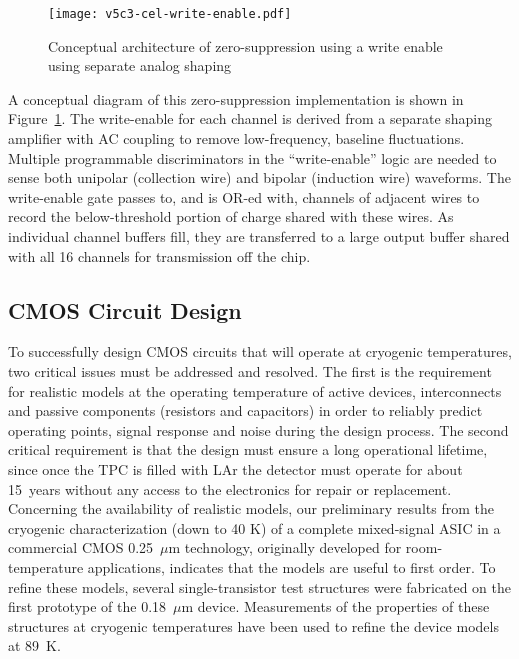 \begin{figure}[htbp]
\centering
\texttt{[image: v5c3-cel-write-enable.pdf]}
\caption[Conceptual architecture of zero-suppression]{Conceptual architecture of zero-suppression using a write enable using separate analog shaping}
\label{fig:tpc-elec-write-enable}
\end{figure}


A conceptual diagram of this zero-suppression implementation is shown
in Figure~\ref{fig:tpc-elec-write-enable}. The write-enable for each channel is derived from a separate
shaping amplifier with AC coupling to remove low-frequency, baseline
fluctuations. Multiple programmable discriminators in the
``write-enable'' logic are
needed to sense both unipolar (collection wire) and bipolar (induction
wire) waveforms.  The write-enable gate passes to, and is OR-ed with,
channels of adjacent wires to record the below-threshold portion of
charge shared with these wires. As individual channel buffers fill, they
are transferred to a large output buffer shared with all 16
channels for transmission off the chip.

\subsection{CMOS Circuit Design}

To successfully design CMOS circuits that will operate at cryogenic 
temperatures, two critical issues must be addressed and resolved. 
The first is the requirement for realistic models at the operating temperature 
of active devices, interconnects and passive components (resistors and 
capacitors) in order to reliably predict operating points, signal response 
and noise during the design process. The second critical requirement is 
that the design must ensure a long operational lifetime, since once the TPC is filled 
with LAr the detector must operate for about 15~years without any access to the 
electronics for repair or replacement. Concerning the availability of realistic models, 
our preliminary results from the cryogenic characterization (down to 40 K) of a complete 
mixed-signal ASIC \cite{CMOS-Compton} in a commercial CMOS 0.25~$\mu$m technology, 
originally developed for room-temperature applications, indicates that the models 
are useful to first order. To refine these models, several 
single-transistor test structures were fabricated on the first prototype of the 0.18~$\mu$m device. 
Measurements of the properties of these structures at cryogenic temperatures 
have been used to refine the device models at 89~K. 

